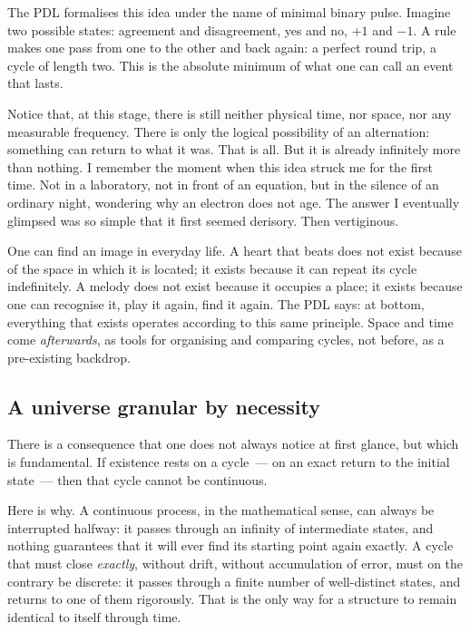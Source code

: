 \documentclass[12pt, a4paper, openright]{book}
\begin{document}
The PDL formalises this idea under the name of minimal binary pulse. Imagine two possible states: agreement and disagreement, yes and no, $+1$ and $-1$. A rule makes one pass from one to the other and back again: a perfect round trip, a cycle of length two. This is the absolute minimum of what one can call an event that lasts.

\medskip

Notice that, at this stage, there is still neither physical time, nor space, nor any measurable frequency. There is only the logical possibility of an alternation: something can return to what it was. That is all. But it is already infinitely more than nothing. I remember the moment when this idea struck me for the first time. Not in a laboratory, not in front of an equation, but in the silence of an ordinary night, wondering why an electron does not age. The answer I eventually glimpsed was so simple that it first seemed derisory. Then vertiginous.

\medskip

One can find an image in everyday life. A heart that beats does not exist because of the space in which it is located; it exists because it can repeat its cycle indefinitely. A melody does not exist because it occupies a place; it exists because one can recognise it, play it again, find it again. The PDL says: at bottom, everything that exists operates according to this same principle. Space and time come \emph{afterwards}, as tools for organising and comparing cycles, not before, as a pre-existing backdrop.

\subsection*{A universe granular by necessity}

There is a consequence that one does not always notice at first glance, but which is fundamental. If existence rests on a cycle~--- on an exact return to the initial state~--- then that cycle cannot be continuous.

\medskip

Here is why. A continuous process, in the mathematical sense, can always be interrupted halfway: it passes through an infinity of intermediate states, and nothing guarantees that it will ever find its starting point again exactly. A cycle that must close \emph{exactly}, without drift, without accumulation of error, must on the contrary be discrete: it passes through a finite number of well-distinct states, and returns to one of them rigorously. That is the only way for a structure to remain identical to itself through time.
\end{document}

